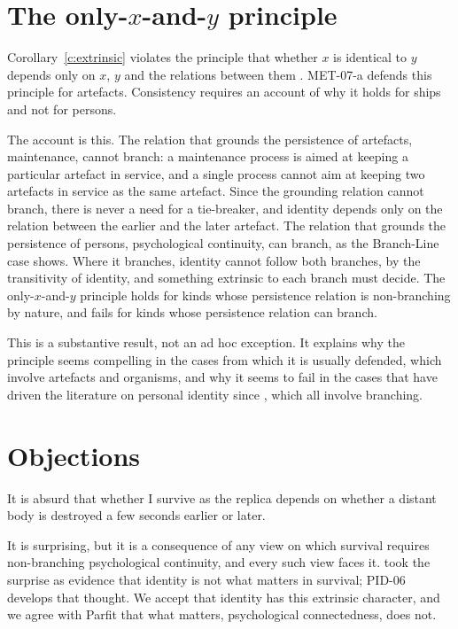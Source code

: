 \documentclass{situationist-preprint}
\begin{document}
\section{The only-$x$-and-$y$ principle}

Corollary~\ref{c:extrinsic} violates the principle that whether $x$ is identical to $y$ depends only on $x$, $y$ and the relations between them \citep{Wiggins1980,Noonan1985}. MET-07-a defends this principle for artefacts. Consistency requires an account of why it holds for ships and not for persons.

The account is this. The relation that grounds the persistence of artefacts, maintenance, cannot branch: a maintenance process is aimed at keeping a particular artefact in service, and a single process cannot aim at keeping two artefacts in service as the same artefact. Since the grounding relation cannot branch, there is never a need for a tie-breaker, and identity depends only on the relation between the earlier and the later artefact. The relation that grounds the persistence of persons, psychological continuity, can branch, as the Branch-Line case shows. Where it branches, identity cannot follow both branches, by the transitivity of identity, and something extrinsic to each branch must decide. The only-$x$-and-$y$ principle holds for kinds whose persistence relation is non-branching by nature, and fails for kinds whose persistence relation can branch.

This is a substantive result, not an ad hoc exception. It explains why the principle seems compelling in the cases from which it is usually defended, which involve artefacts and organisms, and why it seems to fail in the cases that have driven the literature on personal identity since \citet{Williams1970}, which all involve branching.

\section{Objections}

\begin{objection}
It is absurd that whether I survive as the replica depends on whether a distant body is destroyed a few seconds earlier or later.
\end{objection}

\begin{reply}
It is surprising, but it is a consequence of any view on which survival requires non-branching psychological continuity, and every such view faces it. \citet{Parfit1984} took the surprise as evidence that identity is not what matters in survival; PID-06 develops that thought. We accept that identity has this extrinsic character, and we agree with Parfit that what matters, psychological connectedness, does not.
\end{reply}
\end{document}
